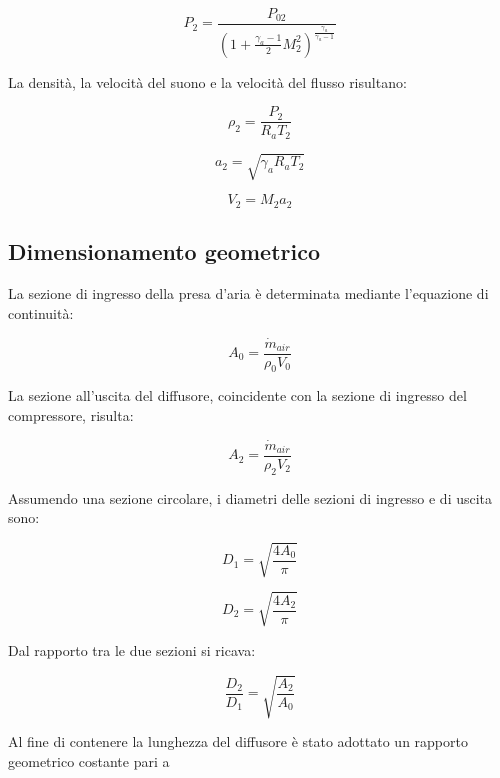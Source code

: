\begin{equation*}
    P_2=
    \frac{P_{02}}
    {\left(1+\frac{\gamma_a-1}{2}M_2^2\right)^{\frac{\gamma_a}{\gamma_a-1}}}
\end{equation*}

La densità, la velocità del suono e la velocità del flusso risultano:

\begin{equation*}
    \rho_2=\frac{P_2}{R_aT_2}
\end{equation*}

\begin{equation*}
    a_2=\sqrt{\gamma_aR_aT_2}
\end{equation*}

\begin{equation*}
    V_2=M_2a_2
\end{equation*}


\subsection{Dimensionamento geometrico }

La sezione di ingresso della presa d'aria è determinata mediante l'equazione di continuità:

\begin{equation*}
A_0=
\frac{\dot{m}_{air}}
{\rho_0V_0}
\end{equation*}

La sezione all'uscita del diffusore, coincidente con la sezione di ingresso del compressore, risulta:

\begin{equation*}
A_2=
\frac{\dot{m}_{air}}
{\rho_2V_2}
\end{equation*}

Assumendo una sezione circolare, i diametri delle sezioni di ingresso e di uscita sono:

\begin{equation*}
D_1=
\sqrt{\frac{4A_0}{\pi}}
\end{equation*}

\begin{equation*}
D_2=
\sqrt{\frac{4A_2}{\pi}}
\end{equation*}

Dal rapporto tra le due sezioni si ricava:

\begin{equation*}
\frac{D_2}{D_1}
=
\sqrt{\frac{A_2}{A_0}}
\end{equation*}

Al fine di contenere la lunghezza del diffusore è stato adottato un rapporto geometrico costante pari a

